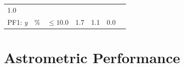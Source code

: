 \documentclass[DM,toc,lsstdraft]{lsstdoc}
\begin{document}
\begin{longtable}[]{@{}lllllll@{}}
\begin{minipage}[t]{0.12\columnwidth}
1.0 \strut
\end{minipage} & \begin{minipage}[t]{0.17\columnwidth}\raggedright\strut
\end{minipage}\tabularnewline
\begin{minipage}[t]{0.12\columnwidth}\raggedright\strut
PF1: \emph{y}\strut
\end{minipage} & \begin{minipage}[t]{0.06\columnwidth}\raggedright\strut
\%\strut
\end{minipage} & \begin{minipage}[t]{0.14\columnwidth}\raggedright\strut
\(\leq 10.0\)\strut
\end{minipage} & \begin{minipage}[t]{0.12\columnwidth}\raggedright\strut
1.7 \strut
\end{minipage} & \begin{minipage}[t]{0.12\columnwidth}\raggedright\strut
1.1 \strut
\end{minipage} & \begin{minipage}[t]{0.12\columnwidth}\raggedright\strut
0.0 \strut
\end{minipage} & \begin{minipage}[t]{0.17\columnwidth}\raggedright\strut
\end{minipage}\tabularnewline
\bottomrule
\end{longtable}

\section{Astrometric Performance}\label{astrometric-performance}
\end{document}
